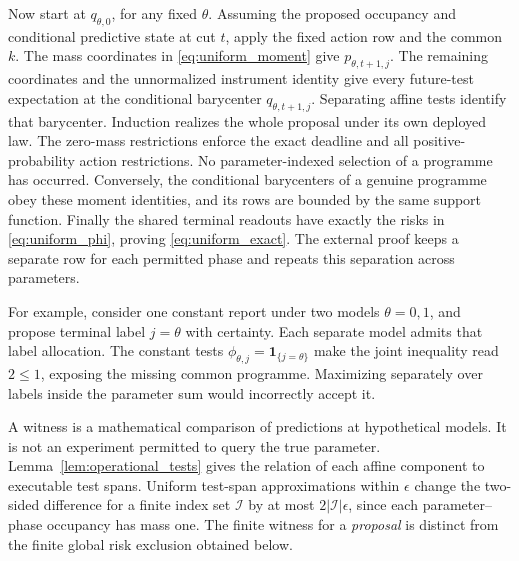Now start at $q_{\theta,0}$, for any fixed $\theta$. Assuming the proposed occupancy and conditional predictive state at cut $t$, apply the fixed action row and the common $k$. The mass coordinates in \eqref{eq:uniform_moment} give $p_{\theta,t+1,j}$. The remaining coordinates and the unnormalized instrument identity give every future-test expectation at the conditional barycenter $q_{\theta,t+1,j}$. Separating affine tests identify that barycenter. Induction realizes the whole proposal under its own deployed law. The zero-mass restrictions enforce the exact deadline and all positive-probability action restrictions. No parameter-indexed selection of a programme has occurred. Conversely, the conditional barycenters of a genuine programme obey these moment identities, and its rows are bounded by the same support function. Finally the shared terminal readouts have exactly the risks in \eqref{eq:uniform_phi}, proving \eqref{eq:uniform_exact}. The external proof keeps a separate row for each permitted phase and repeats this separation across parameters.

For example, consider one constant report under two models $\theta=0,1$, and propose terminal label $j=\theta$ with certainty. Each separate model admits that label allocation. The constant tests $\phi_{\theta,j}=\boldsymbol 1_{\{j=\theta\}}$ make the joint inequality read $2\le1$, exposing the missing common programme. Maximizing separately over labels inside the parameter sum would incorrectly accept it.

A witness is a mathematical comparison of predictions at hypothetical models. It is not an experiment permitted to query the true parameter. Lemma~\ref{lem:operational_tests} gives the relation of each affine component to executable test spans. Uniform test-span approximations within $\epsilon$ change the two-sided difference for a finite index set $\mathcal I$ by at most $2|\mathcal I|\epsilon$, since each parameter--phase occupancy has mass one. The finite witness for a \emph{proposal} is distinct from the finite global risk exclusion obtained below.

